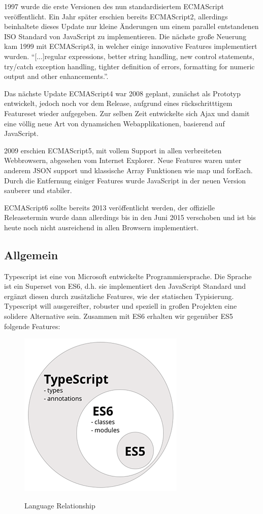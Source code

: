 1997 wurde die erste Versionen des nun standardisiertem ECMAScript veröffentlicht. Ein Jahr später erschien bereits ECMAScript2,
allerdings beinhaltete dieses Update nur kleine Änderungen um einem parallel entstandenen ISO Standard von JavaScript zu implementieren.
Die nächste große Neuerung kam 1999 mit ECMAScript3, in welcher einige innovative Features implementiert wurden.
``[...]regular expressions, better string handling, new control statements, try/catch exception handling, tighter definition of errors, formatting for numeric output and other enhancements.''\cite{js-vs-es}.

Das nächste Update ECMAScript4 war 2008 geplant, zunächst als Prototyp entwickelt,
jedoch noch vor dem Release, aufgrund eines rückschritttigem Featureset wieder aufgegeben.
Zur selben Zeit entwickelte sich Ajax und damit eine völlig neue Art von dynamsichen Webapplikationen,
basierend auf JavaScript.

2009 erschien ECMAScript5, mit vollem Support in allen verbreiteten Webbrowsern, abgesehen vom Internet Explorer.
Neue Features waren unter anderem JSON support und klassische Array Funktionen wie map und forEach.
Durch die Entfernung einiger Features wurde JavaScript in der neuen Version sauberer und stabiler.

ECMAScript6 sollte bereits 2013 veröffentlicht werden, der offizielle Releasetermin wurde
dann allerdings bis in den Juni 2015 verschoben und ist bis heute noch nicht ausreichend in allen Browsern implementiert.
\cite{js-vs-es}

\subsection{Allgemein}

Typescript ist eine von Microsoft entwickelte Programmiersprache.
Die Sprache ist ein Superset von ES6, d.h. sie implementiert den JavaScript Standard und ergänzt diesen
durch zusätzliche Features, wie der statischen Typisierung.
Typescript will ausgereifter, robuster und speziell in großen Projekten eine solidere Alternative sein. \cite[28]{EssentialTS}
Zusammen mit ES6 erhalten wir gegenüber ES5 folgende Features:

\begin{figure}[ht]
 \centering
 \includegraphics[width=0.4\linewidth]{kapitel2/typescript----es5-es6-typescript-circle-diagram.png}
 \caption{Language Relationship}\cite[152]{ng-Book-2}
\end{figure}


